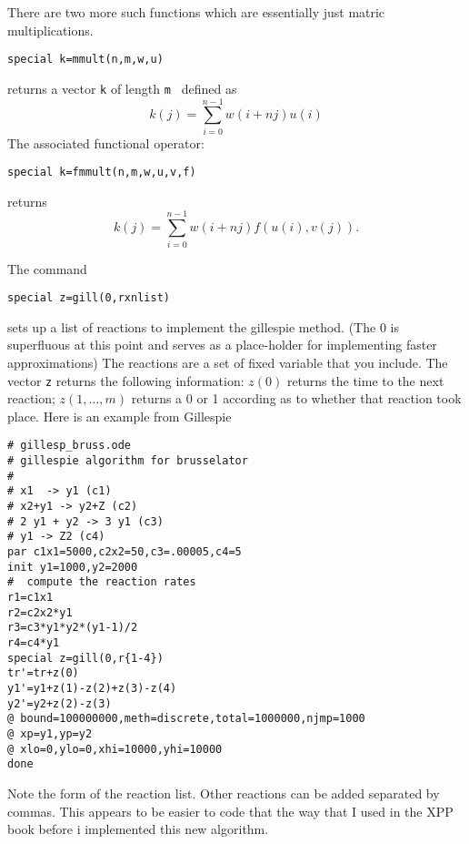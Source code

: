 \documentclass{article}
\newcommand{\tc}[1]{\addcontentsline{toc}{subsection}{#1}}
\begin{document}
There are two more such functions which are essentially just matric
multiplications.
\begin{verbatim}
special k=mmult(n,m,w,u)
\end{verbatim}
returns a vector {\tt k} of length {\tt m } defined as
\[
k(j)=\sum_{i=0}^{n-1} w(i+nj)u(i)
\]
The associated functional operator:
 \begin{verbatim}
special k=fmmult(n,m,w,u,v,f)
\end{verbatim} 
returns
\[
k(j)=\sum_{i=0}^{n-1} w(i+nj)f(u(i),v(j)).
\]
\tc{Gillespie method} The command
\begin{verbatim}
special z=gill(0,rxnlist)
\end{verbatim}
sets up a list of reactions to implement the gillespie method. (The 0
is superfluous at this point and serves as a place-holder for
implementing faster approximations) The reactions are a set of fixed
variable that you include. The vector {\tt z} returns the following
information: $z(0)$ returns the time to the next reaction;
$z(1,\ldots,m)$ returns a 0 or 1 according as to whether that reaction
took place.  Here is an example from Gillespie
\begin{verbatim}
# gillesp_bruss.ode
# gillespie algorithm for brusselator
#
# x1  -> y1 (c1)
# x2+y1 -> y2+Z (c2)
# 2 y1 + y2 -> 3 y1 (c3)
# y1 -> Z2 (c4)
par c1x1=5000,c2x2=50,c3=.00005,c4=5
init y1=1000,y2=2000
#  compute the reaction rates
r1=c1x1
r2=c2x2*y1
r3=c3*y1*y2*(y1-1)/2
r4=c4*y1
special z=gill(0,r{1-4})
tr'=tr+z(0)
y1'=y1+z(1)-z(2)+z(3)-z(4)
y2'=y2+z(2)-z(3)
@ bound=100000000,meth=discrete,total=1000000,njmp=1000
@ xp=y1,yp=y2
@ xlo=0,ylo=0,xhi=10000,yhi=10000
done
\end{verbatim}
Note the form of the reaction list.
Other reactions can be added separated by commas. This appears to be
easier to code that the way that I used in the XPP book before i
implemented  this new algorithm.
\end{document}
